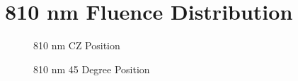 \documentclass[journal,twoside,web]{ieeecolor}
\begin{document}
\appendices

\section{810 nm Fluence Distribution}
\label{app:810Simulations}
\begin{figure}[htb!]
    \caption{\label{fig:810-CZ} 810 nm CZ Position}
\end{figure}

\begin{figure}[htb!]
    \caption{\label{fig:810-45} 810 nm 45 Degree Position}
\end{figure}
\end{document}
